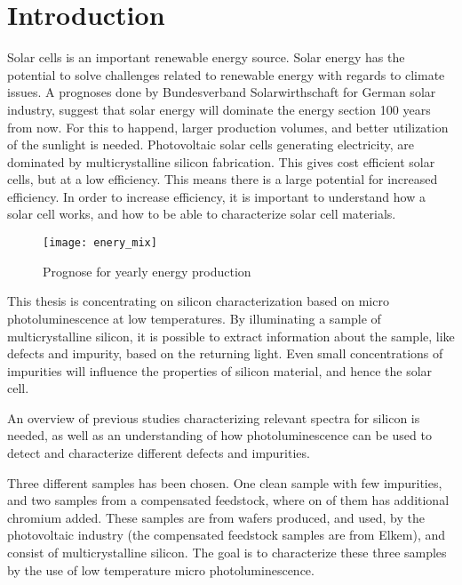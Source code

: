 \section{Introduction}

Solar cells is an important renewable energy source. Solar energy has the potential to solve challenges related to renewable energy with regards to climate issues. A prognoses done by Bundesverband Solarwirthschaft for German solar industry, suggest that solar energy will dominate the energy section 100 years from now. For this to happend, larger production volumes, and better utilization of the sunlight is needed. Photovoltaic solar cells generating electricity, are dominated by multicrystalline silicon fabrication. This gives cost efficient solar cells, but at a low efficiency. This means there is a large potential for increased efficiency. In order to increase efficiency, it is important to understand how a solar cell works, and how to be able to characterize solar cell materials.

\begin{figure}[H]
\texttt{[image: enery\_mix]}%
\caption{Prognose for yearly energy production}%
\label{fig:energimix}%
\end{figure}

This thesis is concentrating on silicon characterization based on micro photoluminescence at low temperatures. By illuminating a sample of multicrystalline silicon, it is possible to extract information about the sample, like defects and impurity, based on the returning light. Even small concentrations of impurities will influence the properties of silicon material, and hence the solar cell. 

An overview of previous studies characterizing relevant spectra for silicon is needed, as well as an understanding of how photoluminescence can be used to detect and characterize different defects and impurities. 

Three different samples has been chosen. One clean sample with few impurities, and two samples from a compensated feedstock, where on of them has additional chromium added. These samples are from wafers produced, and used, by the photovoltaic industry (the compensated feedstock samples are from Elkem), and consist of multicrystalline silicon. The goal is to characterize these three samples by the use of low temperature micro photoluminescence.